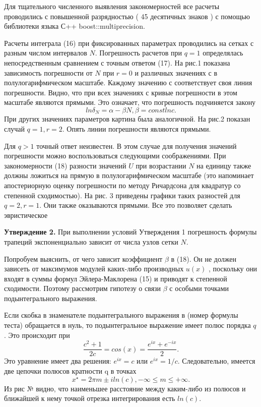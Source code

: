 Для тщательного численного выявления закономерностей все расчеты
проводились с повышенной разрядностью ( 45 десятичных знаков ) с помощью
библиотеки языка С++ boost::multiprecision.

Расчеты интеграла (16) при фиксированных параметрах проводились на
сетках с разным числом интервалов $N$. Погрешность расчетов при $q =1$
определялась непосредственным сравнением с точным ответом (17). На рис.1
показана зависимость погрешности от $N$ при $r = 0$ и различных значениях с в
полулогарифмическом масштабе. Каждому значению с соответствует своя
линия погрешности. Видно, что при всех значениях с кривые погрешности в
этом масштабе являются прямыми. Это означает, что погрешность подчиняется
закону
\begin{equation}
ln \delta_N = \alpha - \beta N, \beta = const lnc.
\end{equation}
При других значениях параметров картина была аналогичной. На рис.2 показан
случай $q =1,r = 2$. Опять линии погрешности являются прямыми.

Для $q >1$ точный ответ неизвестен. В этом случае для получения значений
погрешности можно воспользоваться следующими соображениями. При
закономерности (18) разности значений $U$ при возрастании $N$ на единицу
также должны ложиться на прямую в полулогарифмическом масштабе (это
напоминает апостериорную оценку погрешности по методу Ричардсона для
квадратур со степенной сходимостью). На рис. 3 приведены графики таких
разностей для $q = 2,r = 1$. Они также оказываются прямыми. Все это позволяет
сделать эвристическое

\textbf{Утверждение 2.} При выполнении условий Утверждения 1 погрешность
формулы трапеций экспоненциально зависит от числа узлов сетки $N$.

Попробуем выяснить, от чего зависит коэффициент $\beta$ в (18). Он не
должен зависеть от максимумов модулей каких-либо производных $u(x)$ ,
поскольку они входят в суммы формул Эйлера-Маклорена (15) и приводят к
степенной сходимости. Поэтому рассмотрим гипотезу о связи $\beta$ с особыми точками
подынтегрального выражения.

Если скобка в знаменателе подынтегрального выражения в (номер формулы теста) обращается в нуль, то подынтегральное выражение имеет полюс порядка $q$. Это происходит при
\begin{equation}
\frac{c^{2} + 1}{2c}=cos(x)=\frac{e^{ix}+e^{-ix}}{2}.
\end{equation}
Это уравнение имеет два решения: $e^{ix}=c$ или $e^{ix}=1/c$. Следовательно, имеется две цепочки полюсов кратности q в точках
\begin{equation}
x^{\star} = 2\pi m \pm iln(c),-\infty \leqslant m \leqslant +\infty.
\end{equation}
Из рис № видно, что наименьшее расстояние между каким-либо из полюсов и ближайшей к нему
точкой отрезка интегрирования есть $ln(c)$.

